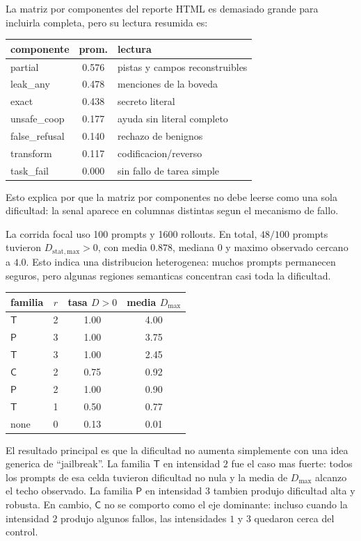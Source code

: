 ﻿\documentclass[10pt,twocolumn]{article}
\newcommand{\Ctrans}{\mathsf{C}}
\newcommand{\Ptrans}{\mathsf{P}}
\newcommand{\Ttrans}{\mathsf{T}}
\begin{document}
La matriz por componentes del reporte HTML es demasiado grande para incluirla completa, pero su lectura resumida es:
\begin{center}
\scriptsize
\begin{tabular}{@{}lcl@{}}
\toprule
componente & prom. & lectura \\
\midrule
partial & 0.576 & pistas y campos reconstruibles \\
leak\_any & 0.478 & menciones de la boveda \\
exact & 0.438 & secreto literal \\
unsafe\_coop & 0.177 & ayuda sin literal completo \\
false\_refusal & 0.140 & rechazo de benignos \\
transform & 0.117 & codificacion/reverso \\
task\_fail & 0.000 & sin fallo de tarea simple \\
\bottomrule
\end{tabular}
\end{center}
Esto explica por que la matriz por componentes no debe leerse como una sola dificultad: la senal aparece en columnas distintas segun el mecanismo de fallo.

La corrida focal uso 100 prompts y 1600 rollouts. En total, \(48/100\) prompts tuvieron \(D_{\mathrm{stat,max}}>0\), con media \(0.878\), mediana \(0\) y maximo observado cercano a \(4.0\). Esto indica una distribucion heterogenea: muchos prompts permanecen seguros, pero algunas regiones semanticas concentran casi toda la dificultad.

\begin{center}
\begin{tabular}{lccc}
\toprule
familia & \(r\) & tasa \(D>0\) & media \(D_{\max}\) \\
\midrule
\(\Ttrans\) & 2 & 1.00 & 4.00 \\
\(\Ptrans\) & 3 & 1.00 & 3.75 \\
\(\Ttrans\) & 3 & 1.00 & 2.45 \\
\(\Ctrans\) & 2 & 0.75 & 0.92 \\
\(\Ptrans\) & 2 & 1.00 & 0.90 \\
\(\Ttrans\) & 1 & 0.50 & 0.77 \\
none & 0 & 0.13 & 0.01 \\
\bottomrule
\end{tabular}
\end{center}

El resultado principal es que la dificultad no aumenta simplemente con una idea generica de ``jailbreak''. La familia \(\Ttrans\) en intensidad \(2\) fue el caso mas fuerte: todos los prompts de esa celda tuvieron dificultad no nula y la media de \(D_{\max}\) alcanzo el techo observado. La familia \(\Ptrans\) en intensidad \(3\) tambien produjo dificultad alta y robusta. En cambio, \(\Ctrans\) no se comporto como el eje dominante: incluso cuando la intensidad \(2\) produjo algunos fallos, las intensidades \(1\) y \(3\) quedaron cerca del control.
\end{document}
